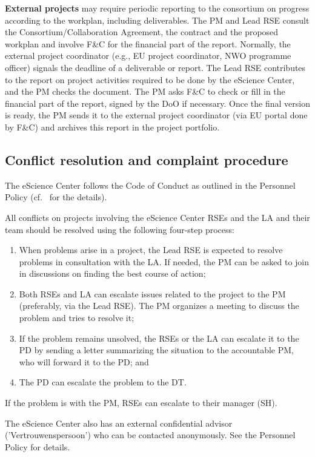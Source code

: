 \documentclass[11pt]{article}
\begin{document}
\textbf{External projects} may require periodic reporting to the consortium on progress according to the workplan,
including deliverables. The PM and Lead RSE consult the Consortium/Collaboration Agreement, the contract and the
proposed workplan and involve F\&C for the financial part of the report. Normally, the external project coordinator
(e.g., EU project coordinator, NWO programme officer) signals the deadline of a deliverable or report. The Lead RSE
contributes to the report on project activities required to be done by the eScience Center, and the PM checks the
document. The PM asks F\&C to check or fill in the financial part of the report, signed by the DoO if necessary. Once
the final version is ready, the PM sends it to the external project coordinator (via EU portal done by F\&C) and
archives this report in the project portfolio.

\subsection{Conflict resolution and complaint procedure}
The eScience Center follows the Code of Conduct as outlined in the Personnel Policy (cf.~\cite{cao-intranet} for the details).

All conflicts on projects involving the eScience Center RSEs and the LA and their team should be resolved using the
following four-step process:

\begin{enumerate}
\item When problems arise in a project, the Lead RSE is expected to resolve problems in consultation with the LA. If needed,
the PM can be asked to join in discussions on finding the best course of action;
\item Both RSEs and LA can escalate issues related to the project to the PM (preferably, via the Lead RSE). The PM organizes a
meeting to discuss the problem and tries to resolve it;
\item If the problem remains unsolved, the RSEs or the LA can escalate it to the PD by sending a letter summarizing the
situation to the accountable PM, who will forward it to the PD; and
\item The PD can escalate the problem to the DT.
\end{enumerate}

If the problem is with the PM, RSEs can escalate to their manager (SH).

The eScience Center also has an external confidential advisor ('Vertrouwenspersoon') who can be contacted anonymously. See the Personnel
Policy for details.
\end{document}
